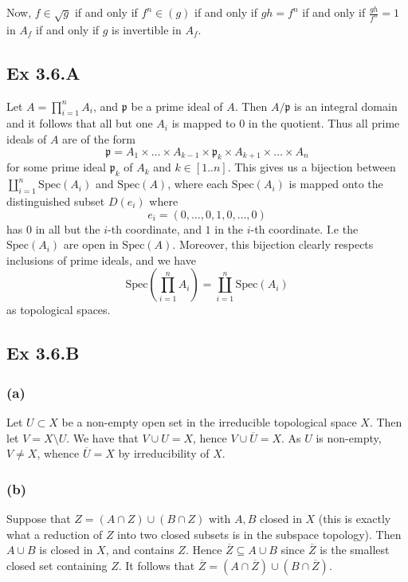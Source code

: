 \documentclass{article}
\theoremstyle{definition}
\newcommand{\Spec}{\text{Spec}}
\begin{document}
Now, $f \in \sqrt{g}$ if and only if $f^n \in (g)$ if and only if $gh = f^n$ if
and only if $\frac{gh}{f^n} = 1$ in $A_f$ if and only if $g$ is invertible in
$A_f$.

\subsection*{Ex 3.6.A}

Let $A = \prod_{i = 1}^{n} A_i$, and $\mathfrak{p}$ be a prime ideal of $A$.
Then $A/\mathfrak{p}$ is an integral domain and it follows that all but one
$A_i$ is mapped to $0$ in the quotient. Thus all prime ideals of $A$ are of the
form 
\[
	\mathfrak{p}
	=
	A_1 \times \ldots \times A_{k - 1} \times \mathfrak{p}_k
	\times A_{k + 1} \times \ldots \times A_n
\] 
for some prime ideal $\mathfrak{p}_k$ of $A_k$ and $k \in [1..n]$. This gives
us a bijection between $\coprod_{i = 1}^{n} \Spec(A_i)$ and $\Spec(A)$, where
each $\Spec(A_i)$ is mapped onto the distinguished subset $D(e_i)$ where
\[
	e_i = (0, \ldots, 0, 1, 0, \ldots, 0)
\] 
has $0$ in all but the $i$-th coordinate, and $1$ in the $i$-th coordinate. I.e
the $\Spec(A_i)$ are open in $\Spec(A)$. Moreover, this bijection clearly
respects inclusions of prime ideals, and we have 
\[
	\Spec\left(
		\prod_{i = 1}^{n} A_i
	\right)
	=
	\coprod_{i = 1}^{n} \Spec(A_i)
\] 
as topological spaces.

\subsection*{Ex 3.6.B}

\subsubsection*{(a)}

Let $U \subset X$ be a non-empty open set in the irreducible topological space
$X$. Then let $V = X \setminus U$. We have that $V \cup U = X$, hence $V \cup
\overline{U} = X$. As $U$ is non-empty, $V \not = X$, whence $\overline{U} = X$
by irreducibility of $X$.

\subsubsection*{(b)}

Suppose that $Z = (A \cap Z) \cup (B \cap Z)$ with $A, B$ closed in $X$ (this
is exactly what a reduction of $Z$ into two closed subsets is in the subspace
topology). Then $A \cup B$ is closed in $X$, and contains $Z$. Hence
$\overline{Z} \subseteq A \cup B$ since $\overline{Z}$ is the smallest closed
set containing $Z$. It follows that $\overline{Z} = (A \cap \overline{Z}) \cup
(B \cap \overline{Z})$. \\
\end{document}
